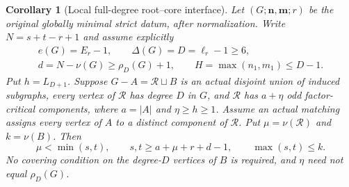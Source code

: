 \documentclass[11pt,a4paper]{article}
\newtheorem{corollary}[theorem]{Corollary}
\theoremstyle{definition}
\begin{document}
\begin{corollary}[Local full-degree root--core interface]
\label{cor:local-root-core-interface}
Let $(G;\mathbf n,\mathbf m;r)$ be the original globally minimal strict
datum, after normalization.  Write $N=s+t-r+1$ and assume explicitly
\[
\begin{gathered}
 e(G)=E_r-1,\qquad \Delta(G)=D=\ell_r-1\ge6,\\
 d=N-\nu(G)\ge\rho_D(G)+1,\qquad
 H=\max(n_1,m_1)\le D-1.
\end{gathered}
\]
Put $h=L_{D+1}$.  Suppose
$G-A=\mathcal R\sqcup B$ is an actual disjoint union of induced
subgraphs, every vertex of $\mathcal R$ has degree $D$ in $G$, and
$\mathcal R$ has $a+\eta$ odd factor-critical components, where
$a=|A|$ and $\eta\ge h\ge1$.
Assume an actual matching assigns every vertex of $A$ to a distinct
component of $\mathcal R$.  Put $\mu=\nu(\mathcal R)$ and $k=\nu(B)$.
Then
\[
 \mu<\min(s,t),\qquad
 s,t\ge a+\mu+r+d-1,\qquad \max(s,t)\le k.
\]
No covering condition on the degree-$D$ vertices of $B$ is required,
and $\eta$ need not equal $\rho_D(G)$.
\end{corollary}
\end{document}

